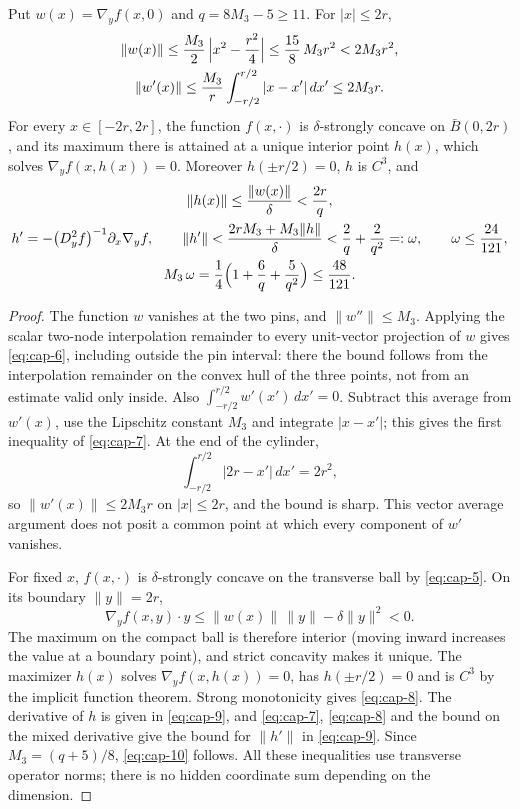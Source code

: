 \begin{lemma}\label{lem:cap-ridge}
Put $w(x)=\nabla_yf(x,0)$ and $q=8M_3-5\ge11$. For $|x|\le2r$,
\begin{gather}
\|w(x)\|\le\frac{M_3}2\,\Bigl|x^2-\frac{r^2}4\Bigr|\le\frac{15}8\,M_3r^2<2M_3r^2,\label{eq:cap-6}\\
\|w'(x)\|\le\frac{M_3}r\int_{-r/2}^{r/2}|x-x'|\,dx'\le2M_3r .\label{eq:cap-7}
\end{gather}
For every $x\in[-2r,2r]$, the function $f(x,\cdot)$ is $\delta$-strongly concave on $\bar B(0,2r)$, and its maximum there is attained at a unique interior point $h(x)$, which solves $\nabla_yf(x,h(x))=0$. Moreover $h(\pm r/2)=0$, $h$ is $C^3$, and
\begin{gather}
\|h(x)\|\le\frac{\|w(x)\|}\delta<\frac{2r}q,\label{eq:cap-8}\\
h'=-\bigl(D_y^2f\bigr)^{-1}\partial_x\nabla_yf,\qquad \|h'\|<\frac{2rM_3+M_3\|h\|}\delta<\frac2q+\frac2{q^2}=:\omega,\qquad \omega\le\frac{24}{121},\label{eq:cap-9}\\
M_3\,\omega=\frac14\Bigl(1+\frac6q+\frac5{q^2}\Bigr)\le\frac{48}{121}.\label{eq:cap-10}
\end{gather}
\end{lemma}

\begin{proof}
The function $w$ vanishes at the two pins, and $\|w''\|\le M_3$. Applying the scalar two-node interpolation remainder to every unit-vector projection of $w$ gives \eqref{eq:cap-6}, including outside the pin interval: there the bound follows from the interpolation remainder on the convex hull of the three points, not from an estimate valid only inside. Also $\int_{-r/2}^{r/2}w'(x')\,dx'=0$. Subtract this average from $w'(x)$, use the Lipschitz constant $M_3$ and integrate $|x-x'|$; this gives the first inequality of \eqref{eq:cap-7}. At the end of the cylinder,
\[
\int_{-r/2}^{r/2}|2r-x'|\,dx'=2r^2,
\]
so $\|w'(x)\|\le2M_3r$ on $|x|\le2r$, and the bound is sharp. This vector average argument does not posit a common point at which every component of $w'$ vanishes.

For fixed $x$, $f(x,\cdot)$ is $\delta$-strongly concave on the transverse ball by \eqref{eq:cap-5}. On its boundary $\|y\|=2r$,
\[
\nabla_yf(x,y)\cdot y\le\|w(x)\|\,\|y\|-\delta\|y\|^2<0 .
\]
The maximum on the compact ball is therefore interior (moving inward increases the value at a boundary point), and strict concavity makes it unique. The maximizer $h(x)$ solves $\nabla_yf(x,h(x))=0$, has $h(\pm r/2)=0$ and is $C^3$ by the implicit function theorem. Strong monotonicity gives \eqref{eq:cap-8}. The derivative of $h$ is given in \eqref{eq:cap-9}, and \eqref{eq:cap-7}, \eqref{eq:cap-8} and the bound on the mixed derivative give the bound for $\|h'\|$ in \eqref{eq:cap-9}. Since $M_3=(q+5)/8$, \eqref{eq:cap-10} follows. All these inequalities use transverse operator norms; there is no hidden coordinate sum depending on the dimension.
\end{proof}

